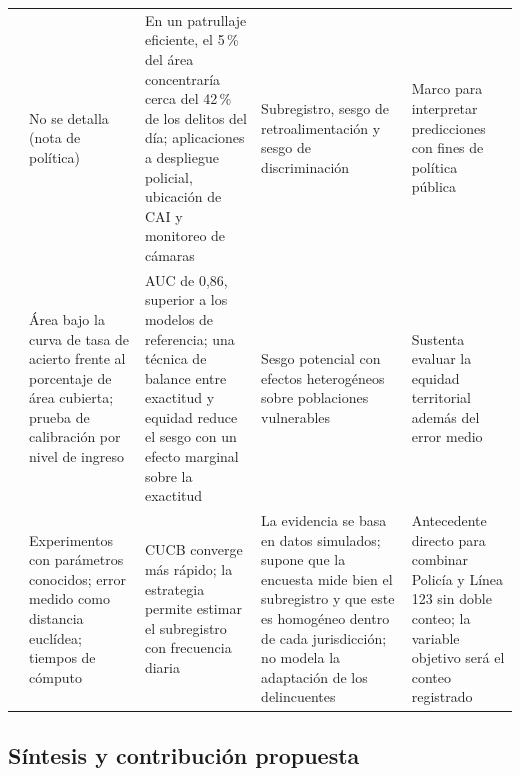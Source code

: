 \documentclass[12pt,letterpaper]{article}
\begin{document}
{\begin{longtable}{@{}>{\raggedright\arraybackslash}p{2.2cm}>{\raggedright\arraybackslash}p{3.1cm}>{\raggedright\arraybackslash}p{3.3cm}>{\raggedright\arraybackslash}p{3.0cm}>{\raggedright\arraybackslash}p{2.9cm}@{}}
\addlinespace
\citet{riascos2020} & No se detalla (nota de política) & En un patrullaje eficiente, el 5\,\% del área concentraría cerca del 42\,\% de los delitos del día; aplicaciones a despliegue policial, ubicación de CAI y monitoreo de cámaras & Subregistro, sesgo de retroalimentación y sesgo de discriminación & Marco para interpretar predicciones con fines de política pública \\
\addlinespace
\citet{urcuqui2020} & Área bajo la curva de tasa de acierto frente al porcentaje de área cubierta; prueba de calibración por nivel de ingreso & AUC de 0,86, superior a los modelos de referencia; una técnica de balance entre exactitud y equidad reduce el sesgo con un efecto marginal sobre la exactitud & Sesgo potencial con efectos heterogéneos sobre poblaciones vulnerables & Sustenta evaluar la equidad territorial además del error medio \\
\addlinespace
\citet{riascos2023} & Experimentos con parámetros conocidos; error medido como distancia euclídea; tiempos de cómputo & CUCB converge más rápido; la estrategia permite estimar el subregistro con frecuencia diaria & La evidencia se basa en datos simulados; supone que la encuesta mide bien el subregistro y que este es homogéneo dentro de cada jurisdicción; no modela la adaptación de los delincuentes & Antecedente directo para combinar Policía y Línea 123 sin doble conteo; la variable objetivo será el conteo registrado \\
\end{longtable}
}

\subsection{Síntesis y contribución propuesta}
\end{document}
